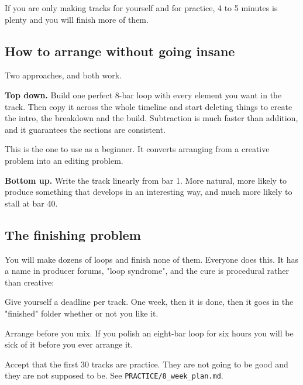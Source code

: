 If you are only making tracks for yourself and for practice, 4 to 5 minutes is plenty and
you will finish more of them.

\subsection{How to arrange without going insane}\label{th06_arrangement-how-to-arrange-without-going-insane}

Two approaches, and both work.

\textbf{Top down.} Build one perfect 8-bar loop with every element you want in the track. Then
copy it across the whole timeline and start deleting things to create the intro, the
breakdown and the build. Subtraction is much faster than addition, and it guarantees the
sections are consistent.

This is the one to use as a beginner. It converts arranging from a creative problem into an
editing problem.

\textbf{Bottom up.} Write the track linearly from bar 1. More natural, more likely to produce
something that develops in an interesting way, and much more likely to stall at bar 40.

\subsection{The finishing problem}\label{th06_arrangement-the-finishing-problem}

You will make dozens of loops and finish none of them. Everyone does this. It has a name in
producer forums, "loop syndrome", and the cure is procedural rather than creative:

Give yourself a deadline per track. One week, then it is done, then it goes in the
"finished" folder whether or not you like it.

Arrange before you mix. If you polish an eight-bar loop for six hours you will be sick of it
before you ever arrange it.

Accept that the first 30 tracks are practice. They are not going to be good and they are not
supposed to be. See \texttt{PRACTICE/8\_week\_plan.md}.
